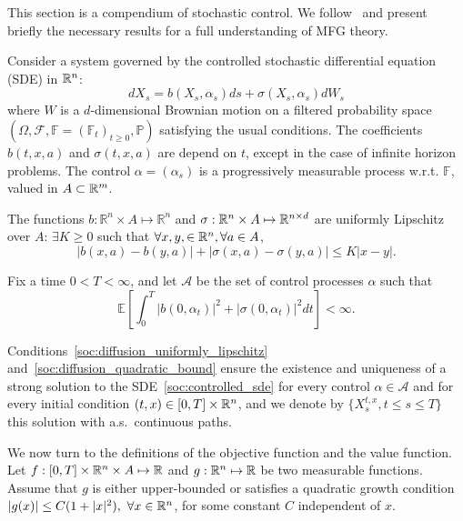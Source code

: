 This section is a compendium of stochastic control.
We follow~\cite{pham2009continuous} and present briefly the necessary results
for a full understanding of MFG theory.

Consider a system governed by the controlled
stochastic differential equation (SDE) in $\mathbb{R}^n$:
\begin{equation}\label{soc:controlled_sde}
    d X_s = b(X_s, \alpha_s)ds + \sigma(X_s, \alpha_s) d W_s
\end{equation}
where $W$ is a $d$-dimensional Brownian motion on a filtered probability space
$(\Omega, \mathcal{F}, \mathbb{F} = {(\mathbb{F}_t)}_{t \geq 0}, \mathbb{P} )$ satisfying the
usual conditions.
The coefficients $b(t,x,a)$ and $\sigma(t,x,a)$ are depend on $t$, except
in the case of infinite horizon problems.
The control $\alpha = (\alpha_s)$ is a progressively measurable process w.r.t.
$\mathbb{F}$, valued in $A \subset \mathbb{R}^m$.

The functions $b: \mathbb{R}^n \times A \mapsto \mathbb{R}^n$ and 
$\sigma: \mathbb{R}^n \times A \mapsto \mathbb{R}^{n\times d}$ are uniformly
Lipschitz over $A$: $\exists K \geq 0$ such that $\forall x,y, \in \mathbb{R}^n, \forall a \in A$,
\begin{equation}\label{soc:diffusion_uniformly_lipschitz}
    | b(x,a) - b(y,a) | + | \sigma(x,a) - \sigma(y,a) | \leq K | x - y |.   
\end{equation}

Fix a time $0 < T < \infty$, and let $\mathcal{A}$ be the set of control processes
$\alpha$ such that
\begin{equation}\label{soc:diffusion_quadratic_bound}
    \mathbb{E}\left[ \int^T_0 |b( 0,\alpha_t )|^2 + |\sigma( 0, \alpha_t )|^2 dt \right] < \infty.
\end{equation}

Conditions~\eqref{soc:diffusion_uniformly_lipschitz} 
and~\eqref{soc:diffusion_quadratic_bound} ensure the existence and uniqueness
of a strong solution to the SDE~\eqref{soc:controlled_sde}
for every control $\alpha \in \mathcal{A}$ and for every initial condition
$(t,x) \in [0,T] \times \mathbb{R}^n$, and we denote by $\{ X_s^{t,x}, t \leq s \leq T \}$
this solution with a.s.\ continuous paths. 

We now turn to the definitions of the objective function and the value function.
Let $ f: [0,T] \times \mathbb{R}^n \times A \mapsto \mathbb{R} $ and $ g: \mathbb{R}^n \mapsto \mathbb{R} $
be two measurable functions. Assume that $g$ is either upper-bounded or 
satisfies a quadratic growth condition 
$| g(x) | \leq C(1 + |x|^2),\ \forall x \in \mathbb{R}^n$, for some constant $C$
independent of $x$.

